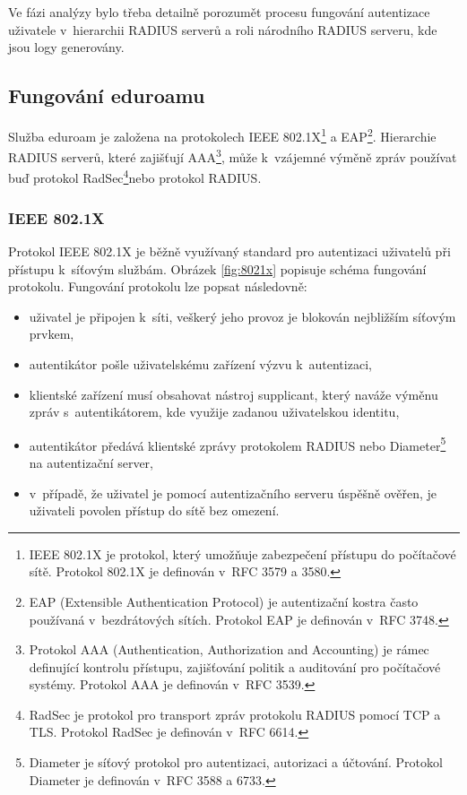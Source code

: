 \documentclass[thesis=M,czech]{FITthesis}[2012/06/26]
\begin{document}
  Ve fázi analýzy bylo třeba detailně porozumět procesu fungování autentizace
  uživatele v~hierarchii RADIUS serverů a roli národního RADIUS serveru, kde jsou logy generovány.

  \subsection{Fungování eduroamu}
    
    Služba eduroam je založena na protokolech IEEE 802.1X\footnote{
      IEEE 802.1X je protokol, který umožňuje zabezpečení přístupu do počítačové sítě.
      Protokol 802.1X je definován v~RFC 3579 a 3580.
    }
    a EAP\footnote{
     EAP (Extensible Authentication Protocol) je autentizační kostra často používaná v~bezdrátových sítích.
     Protokol EAP je definován v~RFC 3748.
    }.
    Hierarchie RADIUS serverů, které zajišťují AAA\footnote{
      Protokol AAA (Authentication, Authorization and Accounting) je rámec definující kontrolu přístupu, 
      zajišťování politik a auditování pro počítačové systémy.
      Protokol AAA je definován v~RFC 3539.
    }, může k~vzájemné výměně zpráv používat buď protokol RadSec\footnote{
      RadSec je protokol pro transport zpráv protokolu RADIUS pomocí TCP a TLS.
      Protokol RadSec je definován v~RFC 6614.
    }nebo protokol RADIUS.

  \subsubsection{IEEE 802.1X}
    Protokol IEEE 802.1X je běžně využívaný standard pro autentizaci uživatelů při přístupu k~síťovým službám. 
    Obrázek \ref{fig:8021x} popisuje schéma fungování protokolu.
    Fungování protokolu lze popsat následovně:
    \begin{itemize}
      \item{uživatel je připojen k~síti, veškerý jeho provoz je blokován nejbližším síťovým prvkem,}
      \item{autentikátor pošle uživatelskému zařízení výzvu k~autentizaci,}
      \item{klientské zařízení musí obsahovat nástroj supplicant, který naváže výměnu zpráv s~autentikátorem, 
        kde využije zadanou uživatelskou identitu,}
      \item{autentikátor předává klientské zprávy protokolem RADIUS nebo Diameter\footnote{
        Diameter je síťový protokol pro autentizaci, autorizaci a účtování.
        Protokol Diameter je definován v~RFC 3588 a 6733.
      } na autentizační server,}
      \item{v~případě, že uživatel je pomocí autentizačního serveru úspěšně ověřen, je uživateli povolen přístup do sítě bez omezení.}
    \end{itemize}
\end{document}
